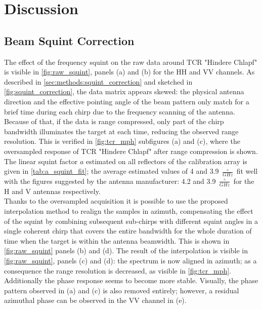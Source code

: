 \section{Discussion}\label{sec:discussion}
\subsection{Beam Squint Correction}\label{sec:discussion:squint_correction}
The effect of the frequency squint on the raw data around TCR "Hindere Chlapf" is visible in \autoref{fig:raw_squint}, panels (a) and (b) for the HH and VV channels. As described in 
\autoref{sec:methods:squint_correction} and sketched in \autoref{fig:squint_correction}, the data matrix appears skewed:  the physical antenna direction and the effective pointing angle of the beam pattern only match for a brief time during each chirp due to the frequency scanning of the antenna. Because of that, if the data is range compressed, only part of the chirp bandwidth illuminates the target at each time, reducing the observed range resolution. This is verified in \autoref{fig:tcr_mph} subfigures (a) and (c), where the oversampled response of TCR "Hindere Chlapf" after range compression is shown.\\
The linear squint factor $a$ estimated on all reflectors of the calibration array is given in \autoref{tab:a_squint_fit};
the average estimated values of 4 and 3.9 $\frac{\circ}{GHz}$  fit well with the figures suggested by the antenna manufacturer: 4.2 and 3.9 $\frac{\circ}{GHz}$ for the H and V antennas respectively.\\
Thanks to the oversampled acquisition it is possible to use the proposed interpolation method to realign the samples in azimuth, compensating the effect of the squint by combining subsequent sub-chirps with different squint angles in a single coherent chirp that covers the entire bandwidth for the whole duration of time when the target is within the antenna beamwidth. This is shown in \autoref{fig:raw_squint} panels (b) and (d). The result of the interpolation is visible in \autoref{fig:raw_squint}, panels (c) and (d): the spectrum is now aligned in azimuth; as a consequence the range resolution is decreased, as visible in \autoref{fig:tcr_mph}. Additionally the phase response seems to become more stable.
Visually, the phase pattern observed in (a) and (c) is also removed entirely; however, a residual azimuthal phase can be observed in the VV channel in (e).
